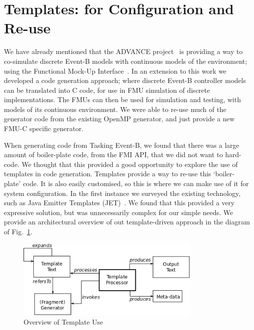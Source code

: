 \documentclass{llncs}%
\begin{document}
\section{Templates: for Configuration and Re-use}\label{templates}
%
We have already mentioned that the ADVANCE project~\cite{advance} is providing a way to co-simulate discrete Event-B models with continuous models of the environment; using the Functional Mock-Up Interface~\cite{FMISTD}. In an extension to this work we developed a code generation approach; where discrete Event-B controller models can be translated into C code, for use in FMU simulation of discrete implementations. The FMUs can then be used for simulation and testing, with models of its continuous environment. We were able to re-use much of the generator code from the existing OpenMP generator, and just provide a new FMU-C specific generator.  

When generating code from Tasking Event-B, we found that there was a large amount of boiler-plate code, from the FMI API, that we did not want to hard-code. We thought that this provided a good opportunity to explore the use of templates in code generation. Templates provide a way to re-use this `boiler-plate' code. It is also easily customised, so this is where we can make use of it for system configuration. In the first instance we surveyed the existing technology, such as Java Emitter Templates (JET)~\cite{JET}. We found that this provided a very expressive solution, but was unnecessarily complex for our simple needs. We provide an architectural overview of out template-driven approach in the diagram of Fig.~\ref{fig:templates}.
%
\begin{figure}
\centering
\includegraphics[width=0.8\textwidth]{templateOverview.png}
\caption{Overview of Template Use}
\label{fig:templates}
\end{figure}
%
\end{document}
